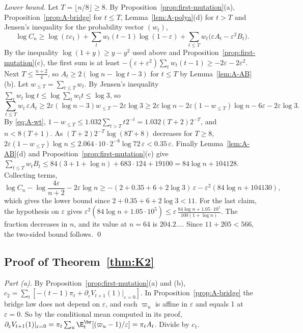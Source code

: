 \emph{Lower bound.} Let $T=\lfloor n/8\rfloor\ge8$. By
Proposition~\ref{prop:first-mutation}(a), Proposition~\ref{prop:A-bridge}
for $t\le T$, Lemma~\ref{lem:A-polya}(d) for $t>T$ and Jensen's inequality
for the probability vector $(w_t)$,
\[
 \log C_n\ge\log(\varepsilon c_1)+\sum_tw_t(t-1)\log(1-\varepsilon)
 +\sum_{t\le T}w_t\bigl(\varepsilon A_t-\varepsilon^2B_t\bigr).
\]
By the inequality $\log(1+y)\ge y-y^2$ used above and
Proposition~\ref{prop:first-mutation}(c), the first sum is at least
$-(\varepsilon+\varepsilon^2)\sum_tw_t(t-1)\ge-2\varepsilon-2\varepsilon^2$.
Next $T\le\frac{n+2}4$, so $A_t\ge2(\log n-\log t-3)$ for $t\le T$ by
Lemma~\ref{lem:A-AB}(b). Let $w_{\le T}=\sum_{t\le T}w_t$. By Jensen's
inequality $\sum_tw_t\log t\le\log\sum_tw_tt\le\log3$, so
\[
 \sum_{t\le T}w_t\,\varepsilon A_t\ge2\varepsilon(\log n-3)w_{\le T}-2\varepsilon\log3
 \ge2\varepsilon\log n-2\varepsilon(1-w_{\le T})\log n-6\varepsilon-2\varepsilon\log3 .
\]
By \eqref{eq:A-wt}, $1-w_{\le T}\le1.032\sum_{t>T}t2^{-t}=1.032(T+2)2^{-T}$,
and $n<8(T+1)$. As $(T+2)2^{-T}\log(8T+8)$ decreases for $T\ge8$,
$2\varepsilon(1-w_{\le T})\log n\le2.064\cdot10\cdot2^{-8}\log72\,
\varepsilon<0.35\,\varepsilon$. Finally Lemma~\ref{lem:A-AB}(d) and
Proposition~\ref{prop:first-mutation}(c) give
$\sum_{t\le T}w_tB_t\le84(3+1+\log n)+683\cdot124+19100
=84\log n+104128$. Collecting terms,
\[
 \log C_n-\log\frac{4\varepsilon}{n+2}-2\varepsilon\log n
 \ge-(2+0.35+6+2\log3)\,\varepsilon-\varepsilon^2(84\log n+104130),
\]
which gives the lower bound since $2+0.35+6+2\log3<11$. For the last claim,
the hypothesis on $\varepsilon$ gives
$\varepsilon^2(84\log n+1.05\cdot10^5)\le\varepsilon\,
\frac{84\log n+1.05\cdot10^5}{100(1+\log n)}$. The fraction decreases in
$n$, and its value at $n=64$ is $204.2\ldots$. Since $11+205<566$, the
two-sided bound follows. \qed

\subsection{Proof of \texorpdfstring{Theorem~\ref{thm:K2}}{Theorem 2.9}}\label{app:erw-K2}

\emph{Part (a).} By Proposition~\ref{prop:first-mutation}(a) and (b),
$c_2=\sum_t[-(t-1)\pi_t+\partial_\varepsilon V_{t+1}(1)|_{\varepsilon=0}]$.
In Proposition~\ref{prop:A-bridge} the bridge law does not depend on
$\varepsilon$, and each $\varpi_u$ is affine in $\varepsilon$ and equals 1 at
$\varepsilon=0$. So by the conditional mean computed in its proof,
$\partial_\varepsilon V_{t+1}(1)|_{\varepsilon=0}
=\pi_t\sum_u\E^{\br}_t[(\varpi_u-1)/\varepsilon]=\pi_tA_t$. Divide by $c_1$.

